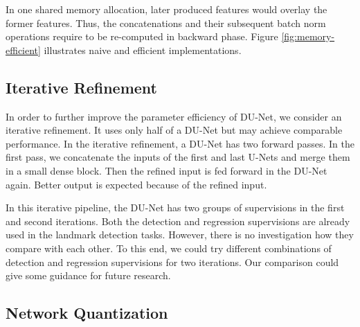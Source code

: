 \documentclass[runningheads]{llncs}
\begin{document}
In one shared memory allocation, later produced features would overlay the former features. Thus, the concatenations and their subsequent batch norm operations require to be re-computed in backward phase. Figure \ref{fig:memory-efficient} illustrates naive and efficient implementations.




\subsection{Iterative Refinement}
In order to further improve the parameter efficiency of DU-Net, we consider an iterative refinement. It uses only half of a DU-Net but may achieve comparable performance. In the iterative refinement, a DU-Net has two forward passes. In the first pass, we concatenate the inputs of the first and last U-Nets and merge them in a small dense block. Then the refined input is fed forward in the DU-Net again. Better output is expected because of the refined input. 

In this iterative pipeline, the DU-Net has two groups of supervisions in the first and second iterations. Both the detection and regression supervisions \cite{bulat2016human} are already used in the landmark detection tasks. However, there is no investigation how they compare with each other. To this end, we could try different combinations of detection and regression supervisions for two iterations. Our comparison could give some guidance for future research. 


\subsection{Network Quantization}
\end{document}
